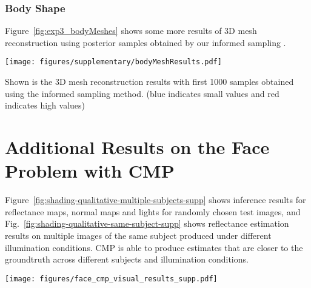 \subsubsection{Body Shape}
Figure~\ref{fig:exp3_bodyMeshes} shows some more results of 3D mesh
reconstruction using posterior samples obtained by our informed
sampling \MIXLMH.

\begin{figure*}[t]
\begin{center}
\centerline{\texttt{[image: figures/supplementary/bodyMeshResults.pdf]}}
  {Shown is the 3D mesh reconstruction results with first 1000 samples obtained
  using the \MIXLMH informed sampling method. (blue indicates small
  values and red indicates high values)}
\label{fig:exp3_bodyMeshes}
\end{center}
\end{figure*}

\clearpage



\section{Additional Results on the Face Problem with CMP}

Figure~\ref{fig:shading-qualitative-multiple-subjects-supp} shows inference results for reflectance maps, normal maps and lights for randomly chosen test images, and Fig.~\ref{fig:shading-qualitative-same-subject-supp} shows reflectance estimation results on multiple images of the same subject produced under different illumination conditions. CMP is able to produce estimates that are closer to the groundtruth across different subjects and illumination conditions.

\begin{figure*}[h]
  \begin{center}
  \centerline{\texttt{[image: figures/face\_cmp\_visual\_results\_supp.pdf]}}
  \vspace{-1.2cm}
  \end{center}
	\label{fig:shading-qualitative-multiple-subjects-supp}
\end{figure*}


